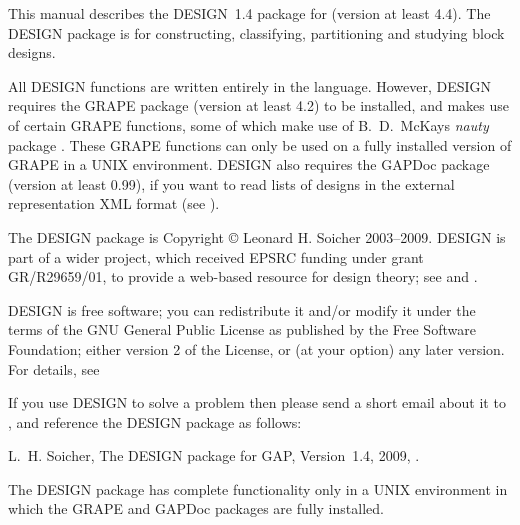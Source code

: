 %
%
%
%
\def\GRAPE{\sf GRAPE}
\def\DESIGN{\sf DESIGN}
\def\GAPDoc{\sf GAPDoc}
\def\nauty{\it nauty}
\def\Aut{{\rm Aut}\,} 


This manual describes the {\DESIGN}~1.4 package for {\GAP} (version at
least 4.4).  The {\DESIGN} package is for constructing, classifying,
partitioning and studying block designs.

All {\DESIGN} functions are written entirely in the {\GAP} language.
However, {\DESIGN} requires the {\GRAPE} package \cite{Grape} (version
at least 4.2) to be installed, and makes use of certain {\GRAPE}
functions, some of which make use of B.~D.~McKay{\pif}s {\nauty}
package \cite{Nauty}. These {\GRAPE} functions can only be used on a
fully installed version of {\GRAPE} in a UNIX environment. {\DESIGN} also
requires the {\GAPDoc} package \cite{GAPDoc} (version at least 0.99),
if you want to read lists of designs in the 
external representation XML format (see \cite{Extrep}).

The {\DESIGN} package is Copyright {\copyright} Leonard H. Soicher
2003--2009.  {\DESIGN} is part of a wider project, which received EPSRC
funding under grant GR/R29659/01, to provide a web-based resource for
design theory; see  and \cite{Dotw}.

{\DESIGN} is free software; you can redistribute it and/or modify
it under the terms of the GNU General Public License as published by
the Free Software Foundation; either version 2 of the License, or
(at your option) any later version. For details, see 

If you use {\DESIGN} to solve a problem then please send a short email
about it to , and reference the {\DESIGN} 
package as follows:

L.~H. Soicher, The {DESIGN} package for {GAP}, Version~1.4, 2009,
.


The {\DESIGN} package has complete functionality only in a UNIX
environment in which the {\GRAPE} and {\GAPDoc} packages are fully
installed.

